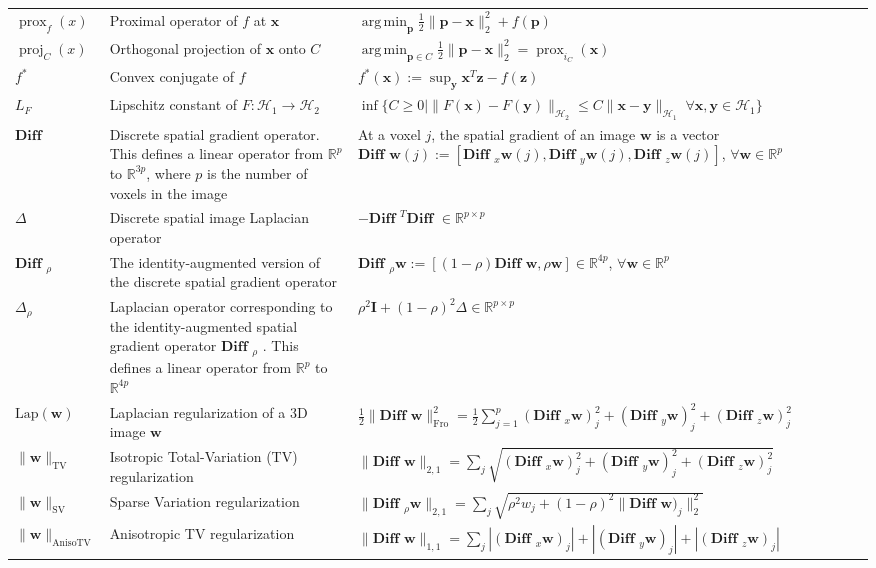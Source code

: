 \documentclass[nobib, a4paper, notoc, twoside, justified, openany]{tufte-book}
\DeclareMathOperator*{\argmin}{arg\,min}
\providecommand{\B}[1]{\mathbf{#1}}
\DeclareMathOperator{\proj}{proj}
\DeclareMathOperator{\prox}{prox}
\def\y{\mathbf{y}}
\def\I{\mathbf{I}}
\def\x{\mathbf{x}}
\def\w{\mathbf{w}}
\begin{document}
\begin{fullwidth}
\begin{longtable}{p{2cm} | p{6cm} | p{9cm}}
  $\prox_f(x)$ & Proximal operator of $f$ at $\B{x}$ & $\argmin_{\B{p}}\frac{1}{2}\|\B{p}-\B{x}\|_2^2 + f(\B{p})$\\

  $\proj_C(x)$ & Orthogonal projection of $\B{x}$ onto $C$ & $\argmin_{\B{p} \in C}\frac{1}{2}\|\B{p}-\B{x}\|_2^2 = \prox_{i_C}(\B{x})$\\
  $f^*$ & Convex conjugate of $f$ & $f^*(\B{x}) := \sup_{\B{y}}\B{x}^T\B{z} - f(\B{z})$\\
  $L_F$ & Lipschitz constant of $F: \mathcal H_1 \rightarrow \mathcal H_2$ & $\inf\{C \ge 0 | \|F(\x) - F(\y)\|_{\mathcal H_2} \le C\|\x - \y\|_{\mathcal H_1}\;\forall \x,\y \in \mathcal H_1\}$ \\
  \midrule

  $\textbf{Diff }$ & Discrete spatial gradient operator. This defines a linear operator from $\mathbb R^p$ to $\mathbb R^{3p}$, where $p$ is the number of voxels in the image & At a voxel $j$, the spatial gradient of an image $\B{w}$ is a vector ${\textbf{Diff }} {\w}(j) := [\textbf{Diff }_{x} {\w}(j), \textbf{Diff }_{y} {\w}(j), \textbf{Diff }_{z} {\w}(j)]$, $\forall \w \in \mathbb R^p$ \\
  
  $\Delta$ & Discrete spatial image Laplacian operator & $-\textbf{Diff }^T\textbf{Diff } \in \mathbb R^{p \times p}$\\
  $\textbf{Diff }_\rho$ & The identity-augmented version of the discrete spatial gradient operator & ${\textbf{Diff }_\rho} {\w} := [(1-\rho)\textbf{Diff }\w, \rho \w] \in \mathbb R^{4p}$, $\forall \w \in \mathbb R^p$ \\
  $\Delta_\rho$ & Laplacian operator corresponding to the identity-augmented spatial gradient operator $\textbf{Diff }_\rho$ . This defines a linear operator from $\mathbb R^p$ to $\mathbb R^{4p}$ & $\rho^2\I + (1-\rho)^2\Delta \in \mathbb R^{p \times p}$ \\
  
  $\text{Lap}(\B{w})$ & Laplacian regularization of a 3D image $\B{w}$ & $\frac{1}{2}\|\textbf{Diff }\w\|_\text{Fro}^2 = \frac{1}{2}\sum_{j=1}^p(\textbf{Diff }_x \B{w})_j^2 + (\textbf{Diff }_y \B{w})_j^2 + (\textbf{Diff }_z \B{w})_j^2$ \\ %
  $\|\B{w}\|_{\text{TV}}$ & Isotropic Total-Variation (TV) regularization & $\|\textbf{Diff }\w\|_{2,1} =
\sum_{j}\sqrt{(\textbf{Diff }_x \B{w})_j^2 + (\textbf{Diff }_y \B{w})_j^2 + (\textbf{Diff }_z \B{w})_j^2}$\\
  $\|\B{w}\|_{\text{SV}}$ & Sparse Variation regularization & $\|\textbf{Diff }_\rho \w\|_{2,1} = \sum_{j}\sqrt{\rho^2 w_j + (1-\rho)^2\|\textbf{Diff }\w)_j\|_2^2}$\\  
  $\|\B{w}\|_{\text{AnisoTV}}$ & Anisotropic TV regularization & $\|\textbf{Diff }\w\|_{1,1} = 
\sum_{j}|(\textbf{Diff }_x \B{w})_j| + |(\textbf{Diff }_y \B{w})_j| + |(\textbf{Diff }_z \B{w})_j|$\\
  


\end{longtable}
\end{fullwidth}
\end{document}
